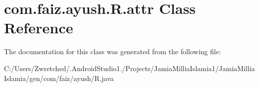\hypertarget{classcom_1_1faiz_1_1ayush_1_1_r_1_1attr}{}\section{com.\+faiz.\+ayush.\+R.\+attr Class Reference}
\label{classcom_1_1faiz_1_1ayush_1_1_r_1_1attr}


The documentation for this class was generated from the following file\+:\begin{DoxyCompactItemize}
\item 
C\+:/\+Users/\+Zwretched/.\+Android\+Studio1./\+Projects/\+Jamia\+Millia\+Islamia1/\+Jamia\+Millia\+Islamia/gen/com/faiz/ayush/R.\+java\end{DoxyCompactItemize}
